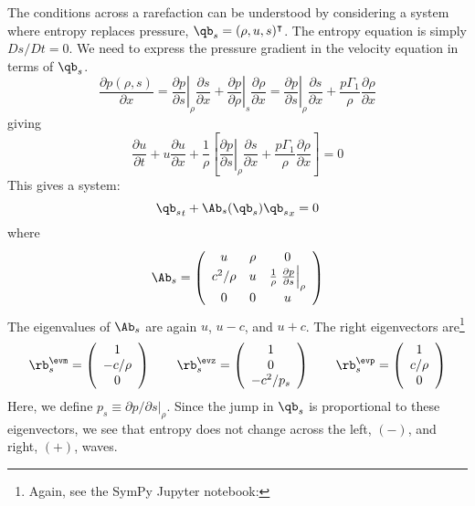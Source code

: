 The conditions across a rarefaction can be understood by considering
a system where entropy replaces pressure, $\qb_s = (\rho, u, s)^\intercal$.
The entropy equation is simply $Ds/Dt = 0$.  We need to express the
pressure gradient in the velocity equation in terms of $\qb_s$.
\begin{equation}
\frac{\partial p(\rho, s)}{\partial x} =
  \left . \frac{\partial p}{\partial s} \right |_\rho \frac{\partial s}{\partial x} +
  \left . \frac{\partial p}{\partial \rho} \right |_s \frac{\partial \rho}{\partial x}
=
  \left . \frac{\partial p}{\partial s} \right |_\rho \frac{\partial s}{\partial x} +
  \frac{p\Gamma_1}{\rho} \frac{\partial \rho}{\partial x}
\end{equation}
giving
\begin{equation}
\frac{\partial u}{\partial t} + u \frac{\partial u}{\partial x} + \frac{1}{\rho} \left [
     \left . \frac{\partial p}{\partial s} \right |_\rho \frac{\partial s}{\partial x} +
          \frac{p\Gamma_1}{\rho} \frac{\partial \rho}{\partial x} \right ] = 0
\end{equation}
This gives a system:
\begin{equation}
{\qb_s}_t + \Ab_s(\qb_s) {\qb_s}_x = 0
\end{equation}
where
\begin{equation}
\Ab_s =
 \left ( \begin{array}{ccc} u & \rho & 0 \\
        c^2/\rho & u & \frac{1}{\rho} \left . \frac{\partial p}{\partial s}\right |_\rho \\
        0 & 0 & u \end{array} \right )
\end{equation}
The eigenvalues of $\Ab_s$ are again $u$, $u-c$, and $u+c$.  The right eigenvectors
are\footnote{Again, see the {\sf SymPy} {\sf Jupyter} notebook:
}
\begin{align}
\rb_s^\evm = \left ( \begin{array}{c} 1 \\ -c/\rho \\ 0 \end{array} \right )
%
\qquad
\rb_s^\evz = \left ( \begin{array}{c} 1 \\ 0 \\ -c^2/p_s  \end{array} \right )
%
\qquad
\rb_s^\evp = \left ( \begin{array}{c} 1 \\ c/\rho \\ 0 \end{array} \right )
\end{align}
Here, we define $p_s \equiv \partial p/\partial s |_\rho$.
Since the jump in $\qb_s$ is proportional to these eigenvectors, we see that
entropy does not change across the left, $(-)$, and right, $(+)$, waves.

